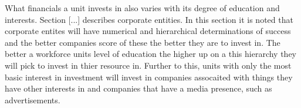 What financials a unit invests in also varies with its degree of education and interests. Section [...] describes corporate entities. In this section it is noted that corporate entites will have numerical and hierarchical determinations of success and the better companies score of these the better they are to invest in. The better a workforce units level of education the higher up on a this hierarchy they will pick to invest in thier resource in. Further to this, units with only the most basic interest in investment will invest in companies assocaited with things they have other interests in and companies that have a media presence, such as advertisements.

 
